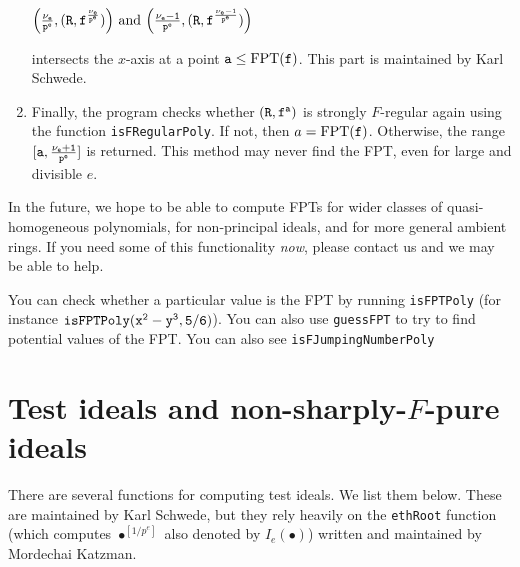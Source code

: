 \documentclass[11pt,fullpage]{amsart}
\theoremstyle{definition}
\theoremstyle{remark}
\begin{document}
\begin{enumerate}
    \begin{center}
${\tt \Big( {\nu_e \over p^e}, (R, f^{\nu_e \over p^e}) \Big) } \text{ and } {\tt \Big( {\nu_e - 1 \over p^e}, (R, f^{\nu_e - 1 \over p^e}) \Big)}$
    \end{center}
    intersects the $x$-axis at a point ${\tt a} \leq  \mathrm{FPT}({\tt f})$.  This part is maintained by Karl Schwede.
\item Finally, the program checks whether ${\tt (R, f^{a})}$ is strongly $F$-regular again using the function {\tt isFRegularPoly}.    If not, then $a = \mathrm{FPT}({\tt f})$.  Otherwise, the range ${\tt [a, {\nu_e + 1 \over p^e}]}$ is returned.  This method may never find the FPT, even for large and divisible $e$.
\end{enumerate}

In the future, we hope to be able to compute FPTs for wider classes of quasi-homogeneous polynomials, for non-principal ideals, and for more general ambient rings.  If you need some of this functionality \emph{now}, please contact us and we may be able to help.

You can check whether a particular value is the FPT by running {\tt isFPTPoly} (for instance ${\tt isFPTPoly(x^2-y^3, 5/6)}$).  You can also use {\tt guessFPT} to try to find potential values of the FPT.
You can also see {\tt isFJumpingNumberPoly}

\section{Test ideals and non-sharply-$F$-pure ideals}

There are several functions for computing test ideals.  We list them below.  These are maintained by Karl Schwede, but they rely heavily on the {\tt ethRoot} function (which computes $\bullet^{[1/p^e]}$ also denoted by $I_e(\bullet)$) written and maintained by Mordechai Katzman.
\end{document}
